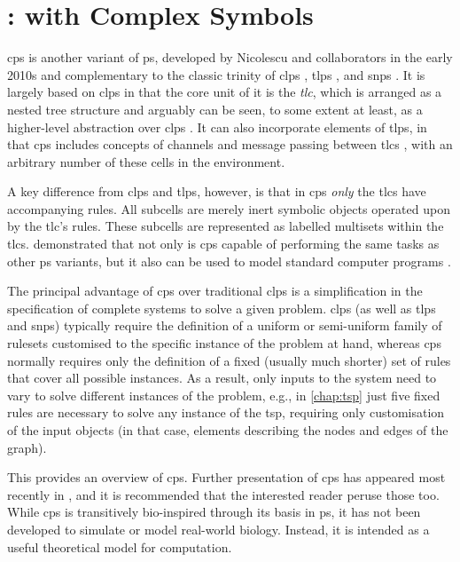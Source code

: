 \chapter{\label{sec:lr:cpsystems}:  with Complex Symbols}

\gls{cps} is another variant of \gls{ps}, developed by Nicolescu and collaborators in the early 2010s \fxerror[inline]{[ref]} and complementary to the classic trinity of \gls{clps} \cite{Paun2000}, \gls{tlps} \cite{Martin-Vide2003}, and \gls{snps} \cite{Ionescu2006}.  It is largely based on \gls{clps} in that the core unit of it is the \emph{\gls{tlc}}, which is arranged as a nested tree structure and arguably can be seen, to some extent at least, as a higher-level abstraction over \gls{clps} \cite{Nicolescu2018}.  It can also incorporate elements of \gls{tlps}, in that \gls{cps} includes concepts of channels and message passing between \glspl{tlc} \cite{Henderson2019}, with an arbitrary number of these cells in the environment.  

A key difference from \gls{clps} and \gls{tlps}, however, is that in \gls{cps} \emph{only} the \glspl{tlc} have accompanying rules.  All subcells are merely inert symbolic objects operated upon by the \gls{tlc}'s rules.  These subcells are represented as labelled multisets within the \glspl{tlc}.  \citeauthor{Nicolescu2014a} demonstrated that not only is \gls{cps} capable of performing the same tasks as other \gls{ps} variants, but it also can be used to model standard computer programs \cite{Nicolescu2014a}.

The principal advantage of \gls{cps} over traditional \gls{clps} is a simplification in the specification of complete systems to solve a given problem.  \Gls{clps} (as well as \gls{tlps} and \gls{snps}) typically require the definition of a uniform or semi-uniform family of rulesets customised to the specific instance of the problem at hand, whereas \gls{cps} normally requires only the definition of a fixed (usually much shorter) set of rules that cover all possible instances. As a result, only inputs to the system need to vary to solve different instances of the problem, e.g., in \cref{chap:tsp} just five fixed rules are necessary to solve any instance of the \gls{tsp}, requiring only customisation of the input objects (in that case, elements describing the nodes and edges of the graph).

This  provides an overview of \gls{cps}.  Further presentation of \gls{cps} has appeared most recently in \cite{Nicolescu2018,Henderson2019,Henderson2020,Liu2020,Liu2021}, and it is recommended that the interested reader peruse those too.  While \gls{cps} is transitively bio-inspired through its basis in \gls{ps}, it has not been developed to simulate or model real-world biology.  Instead, it is intended as a useful theoretical model for computation.


